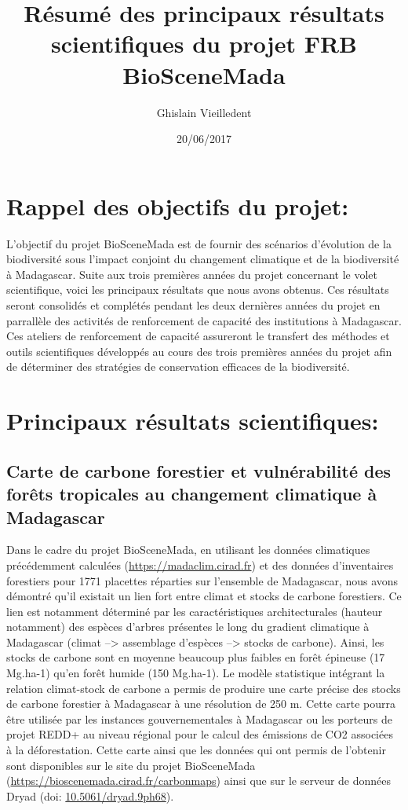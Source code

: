 \documentclass[]{article}
\title{Résumé des principaux résultats scientifiques du projet FRB BioSceneMada}
\author{Ghislain Vieilledent}
\date{20/06/2017}
\begin{document}
\maketitle

\section{Rappel des objectifs du
projet:}\label{rappel-des-objectifs-du-projet}

L'objectif du projet BioSceneMada est de fournir des scénarios
d'évolution de la biodiversité sous l'impact conjoint du changement
climatique et de la biodiversité à Madagascar. Suite aux trois premières
années du projet concernant le volet scientifique, voici les principaux
résultats que nous avons obtenus. Ces résultats seront consolidés et
complétés pendant les deux dernières années du projet en parrallèle des
activités de renforcement de capacité des institutions à Madagascar. Ces
ateliers de renforcement de capacité assureront le transfert des
méthodes et outils scientifiques développés au cours des trois premières
années du projet afin de déterminer des stratégies de conservation
efficaces de la biodiversité.

\section{Principaux résultats
scientifiques:}\label{principaux-resultats-scientifiques}

\subsection{Carte de carbone forestier et vulnérabilité des forêts
tropicales au changement climatique à
Madagascar}\label{carte-de-carbone-forestier-et-vulnerabilite-des-forets-tropicales-au-changement-climatique-a-madagascar}

Dans le cadre du projet BioSceneMada, en utilisant les données
climatiques précédemment calculées (\url{https://madaclim.cirad.fr}) et
des données d'inventaires forestiers pour 1771 placettes réparties sur
l'ensemble de Madagascar, nous avons démontré qu'il existait un lien
fort entre climat et stocks de carbone forestiers. Ce lien est notamment
déterminé par les caractéristiques architecturales (hauteur notamment)
des espèces d'arbres présentes le long du gradient climatique à
Madagascar (climat --\textgreater{} assemblage d'espèces
--\textgreater{} stocks de carbone). Ainsi, les stocks de carbone sont
en moyenne beaucoup plus faibles en forêt épineuse (17 Mg.ha-1) qu'en
forêt humide (150 Mg.ha-1). Le modèle statistique intégrant la relation
climat-stock de carbone a permis de produire une carte précise des
stocks de carbone forestier à Madagascar à une résolution de 250 m.
Cette carte pourra être utilisée par les instances gouvernementales à
Madagascar ou les porteurs de projet REDD+ au niveau régional pour le
calcul des émissions de CO2 associées à la déforestation. Cette carte
ainsi que les données qui ont permis de l'obtenir sont disponibles sur
le site du projet BioSceneMada
(\url{https://bioscenemada.cirad.fr/carbonmaps}) ainsi que sur le
serveur de données Dryad (doi:
\href{http://doi.org/10.5061/dryad.9ph68}{10.5061/dryad.9ph68}).
\end{document}
